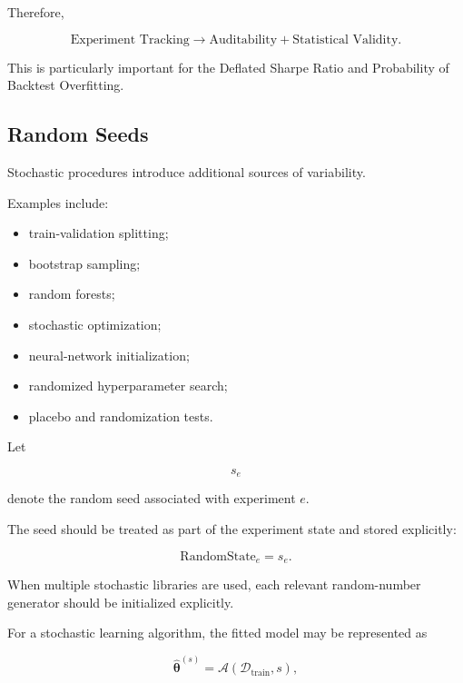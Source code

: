 \documentclass[11pt,a4paper]{article}
\begin{document}
Therefore,

\begin{equation}
\boxed{
\text{Experiment Tracking}
\rightarrow
\text{Auditability}
+
\text{Statistical Validity}.
}
\end{equation}

This is particularly important for the Deflated Sharpe Ratio and Probability of
Backtest Overfitting.


\subsection{Random Seeds}
\label{subsec:random_seeds}

Stochastic procedures introduce additional sources of variability.

Examples include:

\begin{itemize}
    \item train-validation splitting;
    \item bootstrap sampling;
    \item random forests;
    \item stochastic optimization;
    \item neural-network initialization;
    \item randomized hyperparameter search;
    \item placebo and randomization tests.
\end{itemize}

Let

\begin{equation}
s_e
\end{equation}

denote the random seed associated with experiment $e$.

The seed should be treated as part of the experiment state and stored explicitly:

\begin{equation}
\boxed{
\mathrm{RandomState}_e
=
s_e.
}
\end{equation}

When multiple stochastic libraries are used, each relevant random-number
generator should be initialized explicitly.

For a stochastic learning algorithm, the fitted model may be represented as

\begin{equation}
\widehat{\boldsymbol{\theta}}^{(s)}
=
\mathcal{A}
\left(
\mathcal{D}_{\mathrm{train}},
s
\right),
\end{equation}
\end{document}

